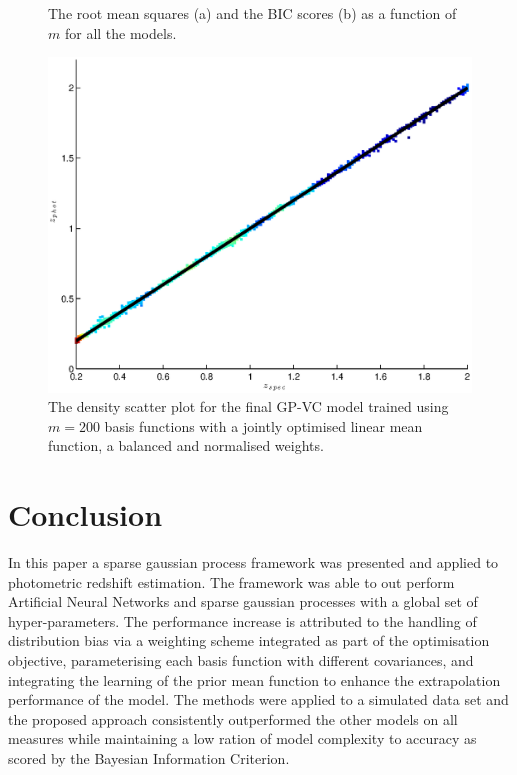 \documentclass[useAMS,usenatbib,fleqn]{mn2e}
\begin{document}
\begin{figure}
       \caption{The root mean squares (a) and the BIC scores (b) as a function of $m$ for all the models.}
	
\end{figure}

\begin{figure}
       \centering
        \includegraphics[width=\columnwidth]{figures/final-model.eps}
        \caption{The density scatter plot for the final GP-VC model trained using $m=200$ basis functions with a jointly optimised linear mean function, a balanced and normalised weights. }
       \label{fig-final-model}
\end{figure}


\section{Conclusion}
In this paper a sparse gaussian process framework was presented and applied to photometric redshift estimation. The framework was able to out perform Artificial Neural Networks and sparse gaussian processes with a global set of hyper-parameters. The performance increase is attributed to the handling of distribution bias via a weighting scheme integrated as part of the optimisation objective, parameterising each basis function with different covariances, and integrating the learning of the prior mean function to enhance the extrapolation performance of the model. The methods were applied to a simulated data set and the proposed approach consistently outperformed the other models on all measures while maintaining a low ration of model complexity to accuracy as scored by the Bayesian Information Criterion.
\label{sec-conclusion}

\footnotesize{


}
\end{document}

